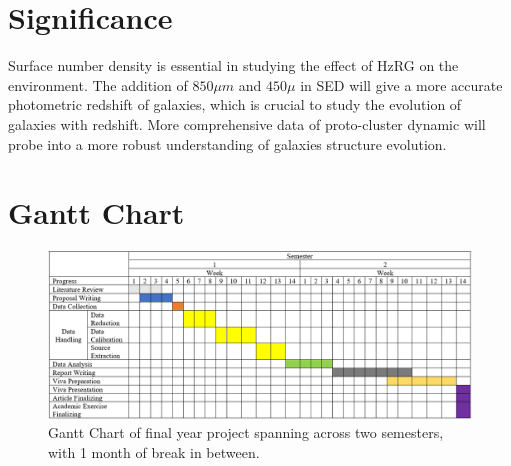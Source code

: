 \documentclass{article}
\begin{document}
\section{Significance}
Surface number density is essential in studying the effect of HzRG on the environment. The addition of $850\mu m$ and $450\mu$ in SED will give a more accurate photometric redshift of galaxies, which is crucial to study the evolution of galaxies with redshift. More comprehensive data of proto-cluster dynamic will probe into a more robust understanding of galaxies structure evolution.

\section{Gantt Chart}
\begin{figure}[h]
    \centering
    \includegraphics[width=150mm]{gantt chart.png}
    \caption{Gantt Chart of final year project spanning across two semesters, with 1 month of break in between.}
    \label{fig:ganttchart}
\end{figure}

\printbibliography
\end{document}
